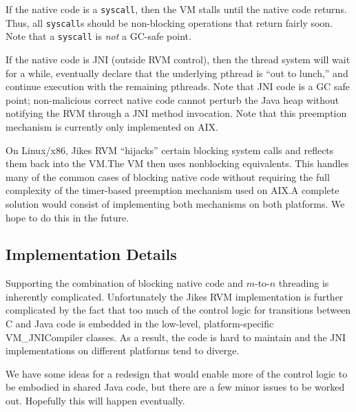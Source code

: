 If the native code is a {\tt syscall}, then the VM stalls until the native
code returns.  Thus, all {\tt syscall}s should be non-blocking
operations that return fairly soon.  Note that a {\tt syscall} is 
{\em not} a GC-safe point.

If the native code is JNI (outside RVM control), then the thread system
will wait for a while, eventually declare that the underlying pthread is ``out to lunch,''
and continue execution with the remaining pthreads.  Note that 
JNI code is a GC safe point; non-malicious correct native code cannot
perturb the Java heap without notifying the RVM through a JNI method
invocation.  Note that this preemption mechanism is currently only
implemented on AIX.\@

On Linux/x86, Jikes RVM ``hijacks'' certain blocking system calls and
reflects them back into the VM.\@  The VM then uses nonblocking
equivalents. This handles many of the common cases of blocking native
code without requiring the full complexity of the timer-based
preemption mechanism used on AIX.\@  A complete solution would consist of
implementing both mechanisms on both platforms.  We hope to do this in
the future.

\subsection{Implementation Details}
Supporting the combination of blocking native code and $m$-to-$n$
threading is inherently complicated.  Unfortunately the Jikes RVM
implementation is further complicated by the fact that too much of the
control logic for transitions between C and Java code is embedded in
the low-level, platform-specific {VM\_JNICompiler} classes.  As a
result, the code is hard to maintain and the JNI implementations
on different platforms tend to diverge. 

We have some ideas for a redesign that would enable more of the
control logic to be embodied in shared Java code, but there are a few
minor issues to be worked out.  Hopefully this will happen eventually.
